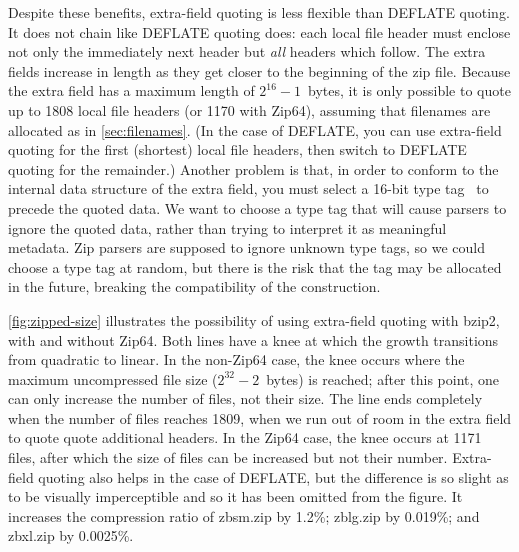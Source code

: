 \documentclass[letterpaper,twocolumn,10pt]{article}
\begin{document}
Despite these benefits, extra-field quoting is less flexible
than DEFLATE quoting.
It does not chain like DEFLATE quoting does:
each local file header must enclose not only the immediately next header
but \emph{all} headers which follow.
The extra fields increase in length as they get closer
to the beginning of the zip file.
Because the extra field has a maximum length of
$2^{16}-1$~bytes,
it is only possible to quote up to \num{1808}
local file headers
(or \num{1170} with Zip64),
assuming that filenames are allocated as in \autoref{sec:filenames}.
(In the case of DEFLATE,
you can use extra-field quoting for the first (shortest) local file headers,
then switch to DEFLATE quoting for the remainder.)
Another problem is that, in order to conform
to the internal data structure of the extra field,
you must select a 16-bit type tag~\cite[\S 4.5.2]{appnote}
to precede the quoted data.
We want to choose a type tag that will cause parsers
to ignore the quoted data, rather than trying to interpret it
as meaningful metadata.
Zip parsers are supposed to ignore unknown type tags,
so we could choose a type tag at random,
but there is the risk that the tag may be allocated in the future,
breaking the compatibility of the construction.

\autoref{fig:zipped-size}
illustrates the possibility of using extra-field quoting
with bzip2, with and without Zip64.
Both lines have a knee at which
the growth transitions from quadratic to linear.
In the non-Zip64 case, the knee occurs where the maximum uncompressed file size
($2^{32}-2$~bytes) is reached;
after this point, one can only increase the number of files, not their size.
The line ends completely when the number of files reaches \num{1809},
when we run out of room in the
extra field to quote quote additional headers.
In the Zip64 case, the knee occurs at \num{1171} files,
after which the size of files can be increased but not their number.
Extra-field quoting also helps in the case of DEFLATE,
but the difference is so slight as to be visually imperceptible
and so it has been omitted from the figure.
It increases the compression ratio of
zbsm.zip by 1.2\%;
zblg.zip by 0.019\%;
and zbxl.zip by 0.0025\%.
\end{document}
